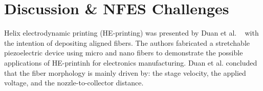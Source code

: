 \documentclass[5p,,preprint,12pt,twocolumn]{elsarticle}
\makeatletter
\def\fixFloatSize#1{}%
\makeatother
\begin{document}
\section{Discussion \& NFES Challenges}
Helix electrodynamic printing (HE-printing) was presented by Duan et al. \unskip~\cite{527120:11974308} with the intention of depositing aligned fibers. The authors fabricated a stretchable piezoelectric device using micro and nano fibers to demonstrate the possible applications of HE-printinh for electronics manufacturing. Duan et al. concluded that the fiber morphology is mainly driven by: the stage velocity, the applied voltage, and the nozzle-to-collector distance.


\bgroup
\fixFloatSize{images/6e169654-19e4-40ab-bb05-8ffb11b5ce11-uplt_cormat.png}
\begin{figure}[!htbp]
\centering \makeatletter{}
\makeatother 
\caption{{}}
\label{f-30543905e028}
\end{figure}
\egroup
\end{document}
